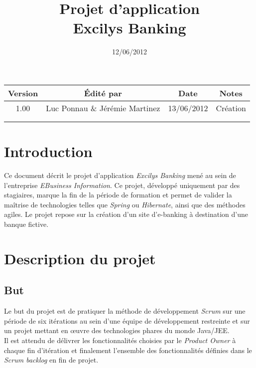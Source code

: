 \documentclass[11pt]{article}
\title{Projet d'application\\Excilys Banking}
\date{12/06/2012}
\begin{document}
\maketitle

\begin{center}
\begin{tabular}{ | c | c | c | c | }
\hline \textbf{Version} & \textbf{Édité par} & \textbf{Date} & \textbf{Notes} \\
\hline 1.00 & Luc Ponnau \& Jérémie Martinez & 13/06/2012 & Création \\
\hline & & & \\
\hline & & & \\ \hline
\end{tabular}
\end{center}

\section{Introduction}

Ce document décrit le projet d'application \emph{Excilys Banking} mené au sein
de l'entreprise \emph{EBusiness Information}. Ce projet, développé uniquement
par des stagiaires, marque la fin de la période de formation et permet de
valider la maîtrise de technologies telles que \emph{Spring} ou \emph{Hibernate},
ainsi que des méthodes agiles. Le projet repose sur la création d'un site
d'e-banking à destination d'une banque fictive.

\section{Description du projet}

\subsection{But}

Le but du projet est de pratiquer la méthode de développement \emph{Scrum} sur
une période de six itérations au sein d'une équipe de développement
restreinte et sur un projet mettant en \oe{}uvre
des technologies phares du monde Java/JEE.\\

Il est attendu de délivrer les fonctionnalités choisies par le \emph{Product Owner}
à chaque fin d'itération et finalement l'ensemble des fonctionnalités définies
dans le \emph{Scrum backlog} en fin de projet.\\
\end{document}
